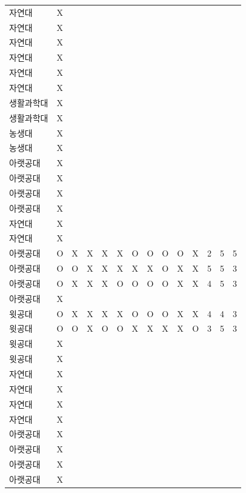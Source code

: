 \documentclass[11pt,a4paper]{article}
\begin{document}
\begin{center}
\begin{supertabular}{ | p{2cm} | x{1.6cm} | x{0.5cm} | x{0.5cm} | x{0.5cm} | x{0.5cm} | x{0.5cm} | x{0.5cm} | x{0.5cm} | x{0.5cm} | x{0.5cm} | x{0.5cm} | x{0.5cm} | x{0.5cm} | }
자연대 & X & & & & & & & & & & & & \\
자연대 & X & & & & & & & & & & & & \\
자연대 & X & & & & & & & & & & & & \\
자연대 & X & & & & & & & & & & & & \\
자연대 & X & & & & & & & & & & & & \\
자연대 & X & & & & & & & & & & & & \\
생활과학대 & X & & & & & & & & & & & & \\
생활과학대 & X & & & & & & & & & & & & \\
농생대 & X & & & & & & & & & & & & \\
농생대 & X & & & & & & & & & & & & \\
아랫공대 & X & & & & & & & & & & & & \\
아랫공대 & X & & & & & & & & & & & & \\
아랫공대 & X & & & & & & & & & & & & \\
아랫공대 & X & & & & & & & & & & & & \\
자연대 & X & & & & & & & & & & & & \\
자연대 & X & & & & & & & & & & & & \\
아랫공대 & O & X & X & X & X & O & O & O & O & X & 2 & 5 & 5 \\
아랫공대 & O & O & X & X & X & X & X & O & X & X & 5 & 5 & 3 \\
아랫공대 & O & X & X & X & O & O & O & O & X & X & 4 & 5 & 3 \\
아랫공대 & X & & & & & & & & & & & & \\
윗공대 & O & X & X & X & X & O & O & O & X & X & 4 & 4 & 3 \\
윗공대 & O & O & X & O & O & X & X & X & X & O & 3 & 5 & 3 \\
윗공대 & X & & & & & & & & & & & & \\
윗공대 & X & & & & & & & & & & & & \\
자연대 & X & & & & & & & & & & & & \\
자연대 & X & & & & & & & & & & & & \\
자연대 & X & & & & & & & & & & & & \\
자연대 & X & & & & & & & & & & & & \\
아랫공대 & X & & & & & & & & & & & & \\
아랫공대 & X & & & & & & & & & & & & \\
아랫공대 & X & & & & & & & & & & & & \\
아랫공대 & X & & & & & & & & & & & & \\

\end{supertabular}
\end{center}
\end{document}
